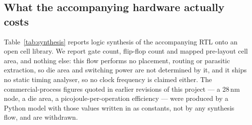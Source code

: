 \subsection{What the accompanying hardware actually costs}
\label{sec:res-hardware}



Table~\ref{tab:synthesis} reports logic synthesis of the accompanying RTL onto an open
cell library. We report gate count, flip-flop count and mapped pre-layout cell area, and
nothing else: this flow performs no placement, routing or parasitic extraction, so die
area and switching power are not determined by it, and it ships no static timing
analyser, so no clock frequency is claimed either. The commercial-process figures quoted in earlier revisions of this project --- a
28\,nm node, a die area, a picojoule-per-operation efficiency --- were produced by a
Python model with those values written in as constants, not by any synthesis flow, and
are withdrawn.

